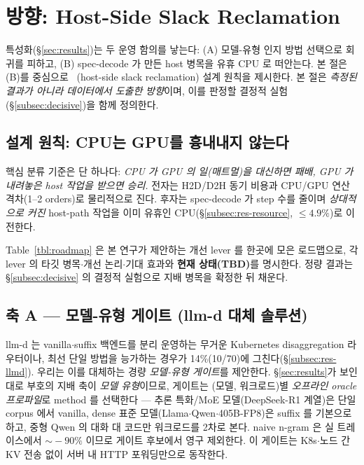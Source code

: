 
\section{방향: Host-Side Slack Reclamation}
\label{sec:direction}

특성화(\S\ref{sec:results})는 두 운영 함의를 낳는다:
(A) 모델-유형 인지 방법 선택으로 회귀를 피하고,
(B) spec-decode 가 만든 host 병목을 유휴 CPU 로 떠안는다.
본 절은 (B)를 중심으로 \algname\ (host-side slack reclamation) 설계 원칙을 제시한다.
본 절은 \emph{측정된 결과가 아니라 데이터에서 도출한 방향}이며,
이를 판정할 결정적 실험(\S\ref{subsec:decisive})을 함께 정의한다.

\subsection{설계 원칙: CPU는 GPU를 흉내내지 않는다}
\label{subsec:principle}

핵심 분류 기준은 단 하나다:
\emph{CPU 가 GPU 의 일(매트멀)을 대신하면 패배, GPU 가 내려놓은 host 작업을 받으면 승리.}
전자는 H2D/D2H 동기 비용과 CPU/GPU 연산 격차(1--2 orders)로 물리적으로 진다.
후자는 spec-decode 가 step 수를 줄이며 \emph{상대적으로 커진} host-path 작업을
이미 유휴인 CPU(\S\ref{subsec:res-resource}, $\le4.9\%$)로 이전한다.

Table~\ref{tbl:roadmap} 은 본 연구가 제안하는 개선 lever 를 한곳에 모은 로드맵으로,
각 lever 의 타깃 병목$\cdot$개선 논리$\cdot$기대 효과와 \textbf{현재 상태(TBD)}를 명시한다.
정량 결과는 \S\ref{subsec:decisive} 의 결정적 실험으로 지배 병목을 확정한 뒤 채운다.



\subsection{축 A — 모델-유형 게이트 (llm-d 대체 솔루션)}
\label{subsec:gate}



llm-d 는 vanilla$\cdot$suffix 백엔드를 분리 운영하는 무거운 Kubernetes disaggregation
라우터이나, 최선 단일 방법을 능가하는 경우가 14\%(10/70)에 그친다(\S\ref{subsec:res-llmd}).
우리는 이를 대체하는 경량 \emph{모델-유형 게이트}를 제안한다.
\S\ref{sec:results}가 보인 대로 부호의 지배 축이 \emph{모델 유형}이므로,
게이트는 (모델, 워크로드)별 \emph{오프라인 oracle 프로파일}로 method 를 선택한다 ---
추론 특화/MoE 모델(DeepSeek-R1 계열)은 단일 corpus 에서 vanilla,
dense 표준 모델(Llama$\cdot$Qwen$\cdot$405B-FP8)은 suffix 를 기본으로 하고,
중형 Qwen 의 대화 대 코드만 워크로드를 2차로 본다.
naive n-gram 은 실 트레이스에서 $\sim\!-90\%$ 이므로 게이트 후보에서 영구 제외한다.
이 게이트는 K8s$\cdot$노드 간 KV 전송 없이 서버 내 HTTP 포워딩만으로 동작한다.

